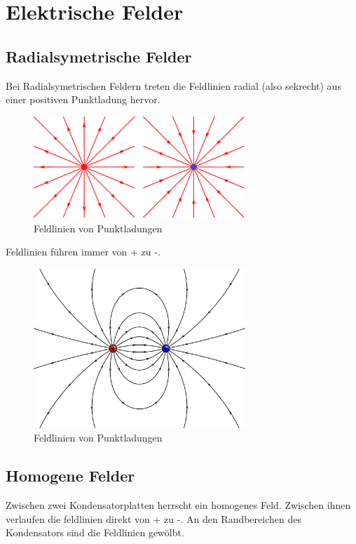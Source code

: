 \documentclass[a4paper]{article}
\begin{document}
\newpage \normalsize


\section{Elektrische Felder}

\subsection{Radialsymetrische Felder}
Bei Radialsymetrischen Feldern treten die Feldlinien radial (also sekrecht)
aus einer positiven Punktladung hervor.

\begin{figure} [h]
	\begin{center}
		\includegraphics[width=8cm]{Bilder/feldlinien_punktladung.png}
		\caption{Feldlinien von Punktladungen}
	\end{center}
\end{figure}

Feldlinien führen immer von + zu -.

\begin{figure} [h]
	\begin{center}
		\includegraphics[width=8cm]{Bilder/field.png}
		\caption{Feldlinien von Punktladungen}
	\end{center}
\end{figure}


\newpage
\subsection{Homogene Felder}
Zwischen zwei Kondensatorplatten herrscht ein homogenes Feld. Zwischen ihnen verlaufen die feldlinien
direkt von + zu -. An den Randbereichen des Kondensators sind die Feldlinien gewölbt.
\end{document}
